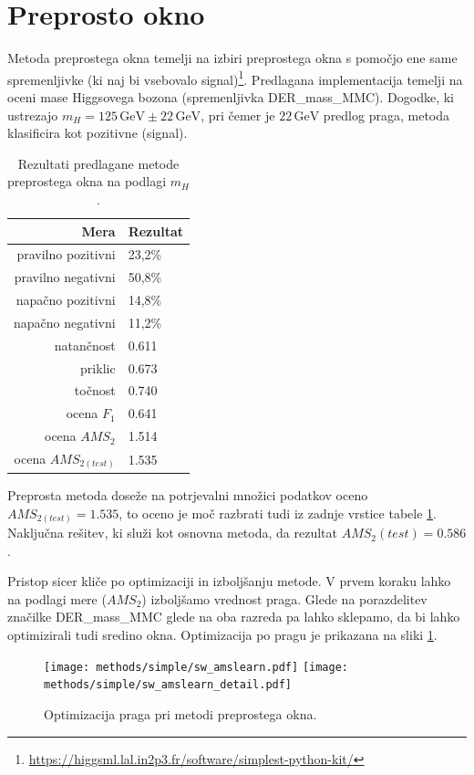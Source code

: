 \documentclass[11pt,a4paper,openany]{book}
\begin{document}
	
\section{Preprosto okno}

Metoda preprostega okna temelji na izbiri preprostega okna s pomočjo ene same spremenljivke (ki naj bi vsebovalo signal)\footnote{\url{https://higgsml.lal.in2p3.fr/software/simplest-python-kit/}}. Predlagana implementacija temelji na oceni mase Higgsovega bozona (spremenljivka DER\_mass\_MMC). Dogodke, ki ustrezajo $m_H = 125\,\text{GeV} \pm 22\,\text{GeV}$, pri čemer je $22\,\text{GeV}$ predlog praga, metoda klasificira kot pozitivne (signal).

\begin{table}[ht]
	\centering
	\begin{tabular}{rl}
		\hline
		\textbf{Mera} & \textbf{Rezultat} \\
		\hline
		pravilno pozitivni & 23,2\%\\
		pravilno negativni & 50,8\% \\
		napačno pozitivni & 14,8\% \\
		napačno negativni & 11,2\% \\
		natančnost & 0.611 \\
		priklic & 0.673 \\
		točnost & 0.740 \\
		ocena $F_1$ & 0.641 \\
		ocena $AMS_2$ & 1.514 \\
		ocena $AMS_{2(test)}$ & 1.535 		
	\end{tabular}
	\caption{Rezultati predlagane metode preprostega okna na podlagi $m_H$.}
	\label{tb:preprosto_okno}
\end{table}

Preprosta metoda doseže na potrjevalni množici podatkov oceno $AMS_{2(test)} = 1.535$, to oceno je moč razbrati tudi iz zadnje vrstice tabele \ref{tb:preprosto_okno}. Naključna rešitev, ki služi kot osnovna metoda, da rezultat $AMS_2{(test)} = 0.586$.

Pristop sicer kliče po optimizaciji in izboljšanju metode. V prvem koraku lahko na podlagi mere ($AMS_2$) izboljšamo vrednost praga. Glede na porazdelitev značilke DER\_mass\_MMC glede na oba razreda pa lahko sklepamo, da bi lahko optimizirali tudi sredino okna. Optimizacija po pragu je prikazana na sliki \ref{sl:simple_optimization_threshold}.

\begin{figure}[h]
	\centering	
	\texttt{[image: methods/simple/sw\_amslearn.pdf]}
	\texttt{[image: methods/simple/sw\_amslearn\_detail.pdf]}		
	
	\caption{Optimizacija praga pri metodi preprostega okna.}
	\label{sl:simple_optimization_threshold}
\end{figure}
\end{document}
